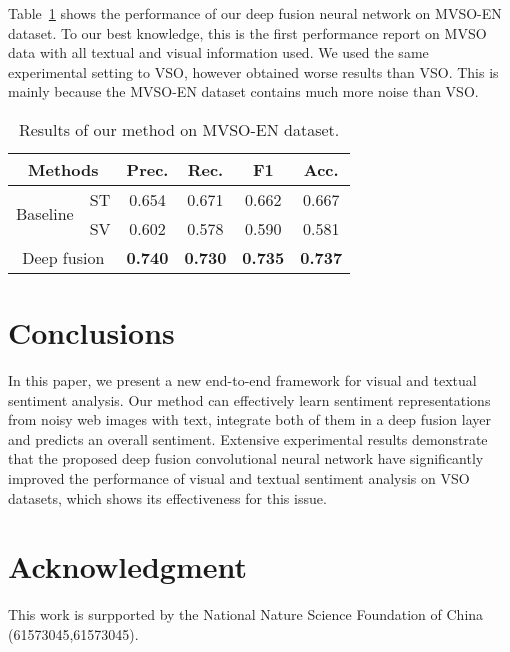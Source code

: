 \documentclass{article}
\begin{document}
Table~\ref{tab:MSVO} shows the performance of our deep fusion neural network on MVSO-EN dataset. To our best knowledge, this is the first performance report on MVSO data with all textual and visual information used. We used the same experimental setting to VSO, however obtained worse results than VSO. This is mainly because the MVSO-EN dataset contains much more noise than VSO.
 \vspace{-0.4cm}
\begin{table}[h]
	\centering
	\caption{Results of our method on MVSO-EN dataset.}
	\label{tab:MSVO}
	\begin{tabular}{c|c|c|c|c|c}
        \hline
        \multicolumn{2}{c|}{\textbf{Methods}} & \textbf{Prec.} & \textbf{Rec.} & \textbf{F1} & \textbf{Acc.} \\
        \hline
        \multirow{2}{*}{Baseline}& ST& 0.654 & 0.671 & 0.662 &  0.667 \\
        \cline{2-6}
                                 & SV & 0.602 &0.578  & 0.590 &  0.581 \\
        \hline
        \multicolumn{2}{c|}{ Deep fusion} & \textbf{0.740} & \textbf{0.730} & \textbf{0.735} & \textbf{0.737}  \\
        \hline

	\end{tabular}
	\vspace{-0.3cm}
\end{table}
\vspace{-0.3cm}
\section{Conclusions}
\vspace{-0.3cm}
\label{sec:ref}
In this paper, we present a new end-to-end framework for visual and textual sentiment analysis. Our method can effectively learn sentiment representations from noisy web images with text,  integrate both of them in a deep fusion layer and predicts an overall sentiment.
Extensive experimental results demonstrate that the proposed deep fusion convolutional neural network have significantly improved the performance of visual and textual sentiment analysis on VSO datasets, which shows its effectiveness for this issue.
\vspace{-0.4cm}
\section*{Acknowledgment}
\vspace{-0.3cm}
This work is surpported by the National Nature Science Foundation of China (61573045,61573045).


\end{document}
